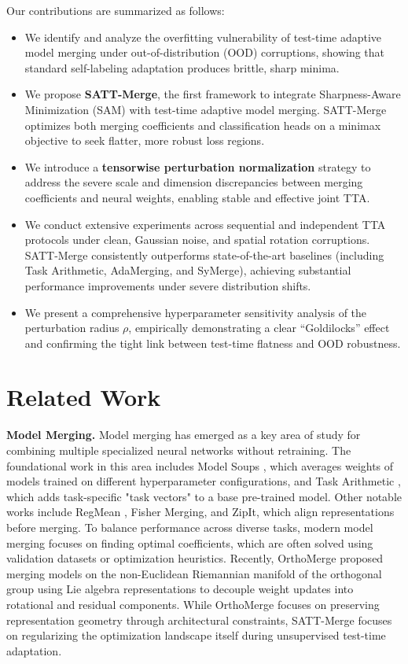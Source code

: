 \documentclass{article}
\begin{document}
Our contributions are summarized as follows:
\begin{itemize}
    \item We identify and analyze the overfitting vulnerability of test-time adaptive model merging under out-of-distribution (OOD) corruptions, showing that standard self-labeling adaptation produces brittle, sharp minima.
    \item We propose \textbf{SATT-Merge}, the first framework to integrate Sharpness-Aware Minimization (SAM) with test-time adaptive model merging. SATT-Merge optimizes both merging coefficients and classification heads on a minimax objective to seek flatter, more robust loss regions.
    \item We introduce a \textbf{tensorwise perturbation normalization} strategy to address the severe scale and dimension discrepancies between merging coefficients and neural weights, enabling stable and effective joint TTA.
    \item We conduct extensive experiments across sequential and independent TTA protocols under clean, Gaussian noise, and spatial rotation corruptions. SATT-Merge consistently outperforms state-of-the-art baselines (including Task Arithmetic, AdaMerging, and SyMerge), achieving substantial performance improvements under severe distribution shifts.
    \item We present a comprehensive hyperparameter sensitivity analysis of the perturbation radius $\rho$, empirically demonstrating a clear ``Goldilocks'' effect and confirming the tight link between test-time flatness and OOD robustness.
\end{itemize}

\section{Related Work}
\label{sec:related}

\textbf{Model Merging.} Model merging has emerged as a key area of study for combining multiple specialized neural networks without retraining. The foundational work in this area includes Model Soups \cite{lotfy2023detecting}, which averages weights of models trained on different hyperparameter configurations, and Task Arithmetic \cite{yang2023adamerging, gargiulo2024task, he2024localizeandstitch}, which adds task-specific "task vectors" to a base pre-trained model. Other notable works include RegMean \cite{wang2024localizing}, Fisher Merging, and ZipIt, which align representations before merging. To balance performance across diverse tasks, modern model merging focuses on finding optimal coefficients, which are often solved using validation datasets or optimization heuristics. Recently, OrthoMerge \cite{orthomerge2026} proposed merging models on the non-Euclidean Riemannian manifold of the orthogonal group using Lie algebra representations to decouple weight updates into rotational and residual components. While OrthoMerge focuses on preserving representation geometry through architectural constraints, SATT-Merge focuses on regularizing the optimization landscape itself during unsupervised test-time adaptation.
\end{document}
